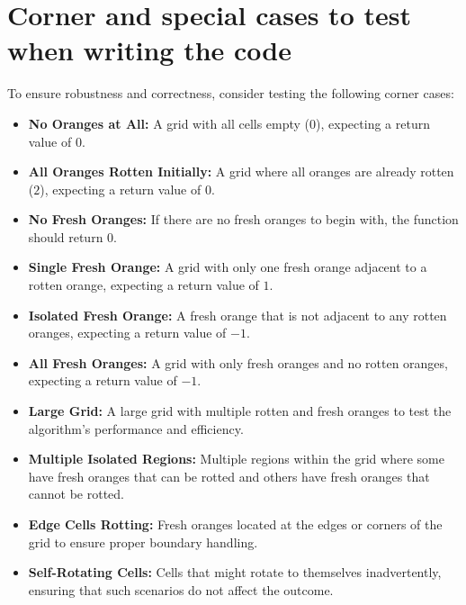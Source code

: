\section*{Corner and special cases to test when writing the code}

To ensure robustness and correctness, consider testing the following corner cases:

\begin{itemize}
    \item \textbf{No Oranges at All:} A grid with all cells empty (\(0\)), expecting a return value of \(0\).
    
    \item \textbf{All Oranges Rotten Initially:} A grid where all oranges are already rotten (\(2\)), expecting a return value of \(0\).
    
    \item \textbf{No Fresh Oranges:} If there are no fresh oranges to begin with, the function should return \(0\).
    
    \item \textbf{Single Fresh Orange:} A grid with only one fresh orange adjacent to a rotten orange, expecting a return value of \(1\).
    
    \item \textbf{Isolated Fresh Orange:} A fresh orange that is not adjacent to any rotten oranges, expecting a return value of \(-1\).
    
    \item \textbf{All Fresh Oranges:} A grid with only fresh oranges and no rotten oranges, expecting a return value of \(-1\).
    
    \item \textbf{Large Grid:} A large grid with multiple rotten and fresh oranges to test the algorithm's performance and efficiency.
    
    \item \textbf{Multiple Isolated Regions:} Multiple regions within the grid where some have fresh oranges that can be rotted and others have fresh oranges that cannot be rotted.
    
    \item \textbf{Edge Cells Rotting:} Fresh oranges located at the edges or corners of the grid to ensure proper boundary handling.
    
    \item \textbf{Self-Rotating Cells:} Cells that might rotate to themselves inadvertently, ensuring that such scenarios do not affect the outcome.
\end{itemize}

\printindex